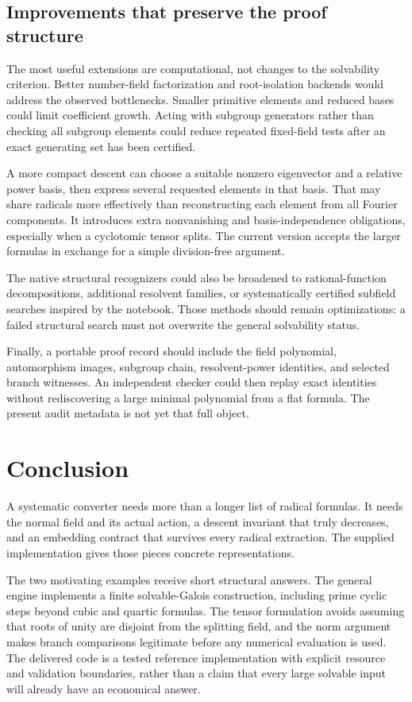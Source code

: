 \documentclass[11pt]{article}
\theoremstyle{definition}\newtheorem{definition}[theorem]{Definition}
\theoremstyle{remark}\newtheorem{remark}[theorem]{Remark}
\begin{document}
\subsection{Improvements that preserve the proof structure}

The most useful extensions are computational, not changes to the solvability
criterion. Better number-field factorization and root-isolation backends would
address the observed bottlenecks. Smaller primitive elements and reduced bases
could limit coefficient growth. Acting with subgroup generators rather than
checking all subgroup elements could reduce repeated fixed-field tests after
an exact generating set has been certified.

A more compact descent can choose a suitable nonzero eigenvector and a relative
power basis, then express several requested elements in that basis. That may
share radicals more effectively than reconstructing each element from all
Fourier components. It introduces extra nonvanishing and basis-independence
obligations, especially when a cyclotomic tensor splits. The current version
accepts the larger formulas in exchange for a simple division-free argument.

The native structural recognizers could also be broadened to rational-function
decompositions, additional resolvent families, or systematically certified
subfield searches inspired by the notebook. Those methods should remain
optimizations: a failed structural search must not overwrite the general
solvability status.

Finally, a portable proof record should include the field polynomial,
automorphism images, subgroup chain, resolvent-power identities, and selected
branch witnesses. An independent checker could then replay exact identities
without rediscovering a large minimal polynomial from a flat formula. The
present audit metadata is not yet that full object.

\section{Conclusion}

A systematic converter needs more than a longer list of radical formulas. It
needs the normal field and its actual action, a descent invariant that truly
decreases, and an embedding contract that survives every radical extraction.
The supplied implementation gives those pieces concrete representations.

The two motivating examples receive short structural answers. The general
engine implements a finite solvable-Galois construction, including prime cyclic
steps beyond cubic and quartic formulas. The tensor formulation avoids assuming
that roots of unity are disjoint from the splitting field, and the norm argument
makes branch comparisons legitimate before any numerical evaluation is used.
The delivered code is a tested reference implementation with explicit resource
and validation boundaries, rather than a claim that every large solvable input
will already have an economical answer.
\end{document}
